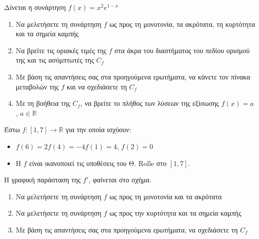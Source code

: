 \documentclass{../presentation}
\begin{document}
\begin{askisi}
  Δίνεται η συνάρτηση $f(x)=x^2e^{1-x}$
  \begin{enumerate}[<+->]
    \item Να μελετήσετε τη συνάρτηση $f$ ως προς τη μονοτονία, τα ακρότατα, τη κυρτότητα και τα σημεία καμπής
    \item Να βρείτε τις οριακές τιμές της $f$ στα άκρα του διαστήματος του πεδίου ορισμού της και τις ασύμπτωτές της $C_f$
    \item Με βάση τις απαντήσεις σας στα προηγούμενα ερωτήματα, να κάνετε τον πίνακα μεταβολών της $f$ και να σχεδιάσετε τη $C_f$
    \item Με τη βοήθεια της $C_f$, να βρείτε το πλήθος των λύσεων της εξίσωσης $f(x)=a$, $a\in\mathbb{R}$
  \end{enumerate}
\end{askisi}

\begin{askisi}
  Έστω $f:[1,7]\to\mathbb{R}$ για την οποία ισχύουν:
  \begin{itemize}
    \item $f(6)=2f(4)=-4f(1)=4$, $f(2)=0$
    \item Η $f$ είναι ικανοποιεί τις υποθέσεις του Θ. Rolle στο $[1,7]$.
  \end{itemize}
  Η γραφική παράσταση της $f'$, φαίνεται στο σχήμα.
  \begin{enumerate}[<+->]
    \item Να μελετήσετε τη συνάρτηση $f$ ως προς τη μονοτονία και τα ακρότατα
    \item Να μελετήσετε τη συνάρτηση $f$ ως προς την κυρτότητα και τα σημεία καμπής
    \item Με βάση τις απαντήσεις σας στα προηγούμενα ερωτήματα, να σχεδιάσετε τη $C_f$
  \end{enumerate}
\end{askisi}
\end{document}
